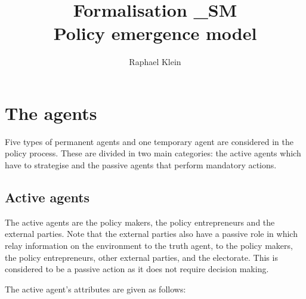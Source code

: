 \documentclass[11pt]{article}
\title{Formalisation \_SM \\ Policy emergence model}
\author{Raphael Klein}
\begin{document}
\maketitle



\tableofcontents


\section{The agents}
\label{sec:agents}

Five types of permanent agents and one temporary agent are considered in the policy process. These are divided in two main categories: the active agents which have to strategise and the passive agents  that perform mandatory actions.

\subsection{Active agents}
\label{ssec:activeAgents}

The active agents are the policy makers, the policy entrepreneurs and the external parties. Note that the external parties also have a passive role in which relay information on the environment to the truth agent, to the policy makers, the policy entrepreneurs, other external parties, and the electorate. This is considered to be a passive action as it does not require decision making.

The active agent's attributes are given as follows:
\end{document}
